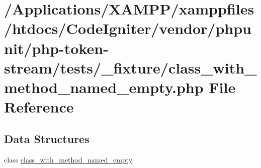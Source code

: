 \hypertarget{class__with__method__named__empty_8php}{}\section{/\+Applications/\+X\+A\+M\+P\+P/xamppfiles/htdocs/\+Code\+Igniter/vendor/phpunit/php-\/token-\/stream/tests/\+\_\+fixture/class\+\_\+with\+\_\+method\+\_\+named\+\_\+empty.php File Reference}
\label{class__with__method__named__empty_8php}
\subsection*{Data Structures}
\begin{DoxyCompactItemize}
\item 
class \mbox{\hyperlink{classclass__with__method__named__empty}{class\+\_\+with\+\_\+method\+\_\+named\+\_\+empty}}
\end{DoxyCompactItemize}
